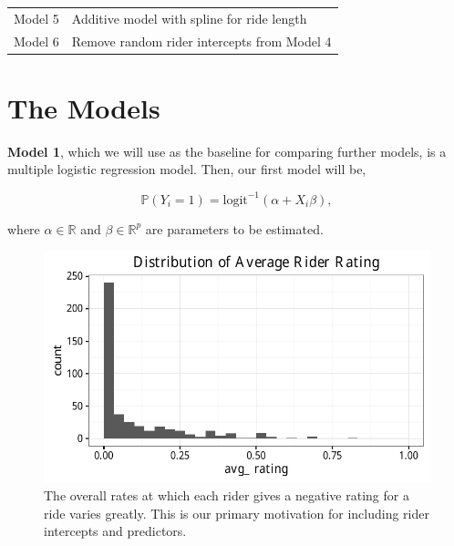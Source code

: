 \documentclass[12pt,twoside]{reedthesis}
\begin{document}
\begin{longtable}[c]{@{}ll@{}}
\begin{minipage}[t]{0.13\columnwidth}
  Model 5
  \strut\end{minipage} &
  \begin{minipage}[t]{0.72\columnwidth}\raggedright\strut
  Additive model with spline for ride length
  \strut\end{minipage}\tabularnewline
  \begin{minipage}[t]{0.13\columnwidth}\raggedright\strut
  Model 6
  \strut\end{minipage} &
  \begin{minipage}[t]{0.72\columnwidth}\raggedright\strut
  Remove random rider intercepts from Model 4
  \strut\end{minipage}\tabularnewline
  \bottomrule
  \end{longtable}
  
  \section{The Models}\label{the-models}
  
  \textbf{Model 1}, which we will use as the baseline for comparing
  further models, is a multiple logistic regression model. Then, our first
  model will be,
  
  \[ \mathbb{P} (Y_i=1) = \text{logit}^{-1} (\alpha + X_i \beta),\]
  
  where \(\alpha \in \mathbb{R}\) and \(\beta \in \mathbb{R}^p\) are
  parameters to be estimated.
  
  \begin{figure}[tbh]
  \centering
  \includegraphics[angle = 0,scale = 1]{figure/rider_avgs.pdf}
  \caption[The overall rates at which each rider gives a negative rating for a
  ride varies greatly. This is our primary motivation for including rider intercepts
  and predictors.]{\normalsize{The overall rates at which each rider gives a negative rating for a
  ride varies greatly. This is our primary motivation for including rider intercepts
  and predictors.}}
  \label{fig:rider-avgs}
  \end{figure}
  
\end{document}
